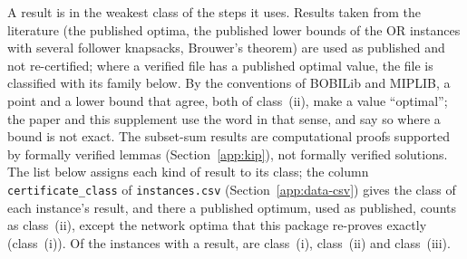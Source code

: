 A result is in the weakest class of the steps it uses. Results taken from
the literature (the published optima, the published lower bounds of the OR
instances with several follower knapsacks, Brouwer's theorem) are used as
published and not re-certified; where a verified file has a published
optimal value, the file is classified with its family below. By the
conventions of BOBILib and MIPLIB, a point and a lower bound that agree,
both of class~(ii), make a value ``optimal''; the paper and this supplement
use the word in that sense, and say so where a bound is not exact. The
subset-sum results are computational proofs supported by formally verified
lemmas (Section~\ref{app:kip}), not formally verified solutions. The list
below assigns each kind of result to its class; the column
\texttt{certificate\_class} of \texttt{instances.csv} (Section~\ref{app:data-csv})
gives the class of each instance's result, and there a published optimum,
used as published, counts as class~(ii), except the \NumClassExactLit{} network
optima that this package re-proves exactly (class~(i)). Of the \NumClassRows{} instances with a
result, \NumClassExact{} are class~(i), \NumClassNumerical{} class~(ii) and
\NumClassBenchmark{} class~(iii).


